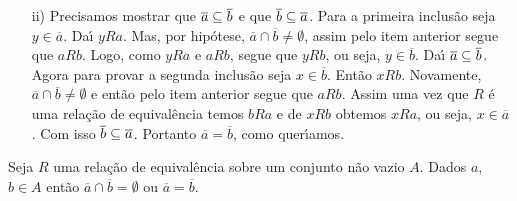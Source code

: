 \documentclass{beamer}
\begin{document}
        \begin{frame}
            \begin{enumerate}
                \item[ii)] Precisamos mostrar que \pause $\overline{a} \subseteq \overline{b}$ \pause e que $\overline{b} \subseteq \overline{a}$. \pause Para a primeira inclus\~ao seja \pause $y \in \overline{a}$. \pause Da{\'\i} $yRa$. \pause Mas, por hip\'otese, \pause $\overline{a}\cap\overline{b}\neq\emptyset$, \pause assim pelo item anterior \pause segue que $aRb$. \pause Logo, como $yRa$ e $aRb$, \pause segue que $yRb$, \pause ou seja, $y \in \overline{b}$. \pause Da{\'\i} $\overline{a}\subseteq\overline{b}$. \pause Agora para provar a segunda inclus\~ao \pause seja $x \in \overline{b}$. \pause Ent\~ao $xRb$. \pause Novamente, $\overline{a} \cap \overline{b} \ne \emptyset$ \pause e ent\~ao pelo item anterior \pause segue que $aRb$. \pause Assim uma vez que $R$ \'e uma rela\c{c}\~ao de equival\^encia \pause temos $bRa$ \pause e de $xRb$ \pause obtemos $xRa$, \pause ou seja, $x \in \overline{a}$. \pause Com isso $\overline{b} \subseteq \overline{a}$. \pause Portanto $\overline{a} = \overline{b}$, \pause como quer{\'\i}amos. \hspace{.2cm} \qedsymbol\pause
            \end{enumerate}
        \vspace{.5cm}
        \begin{corolario}
            Seja $R$ uma rela\c{c}\~ao de equival\^encia sobre um conjunto n\~ao vazio $A$. \pause Dados $a$, $b \in A$ \pause ent\~ao $\overline{a} \cap \overline{b} = \emptyset$ \pause ou $\overline{a} = \overline{b}$.\pause
        \end{corolario}
    \end{frame}
\end{document}
